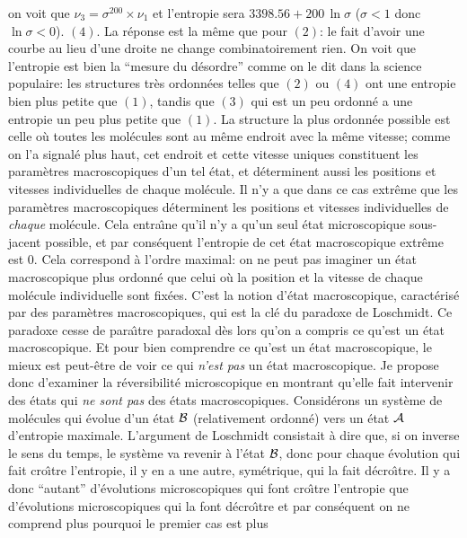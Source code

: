on voit que $\nu_3 = \sigma^{200} \times \nu_1$ et l'entropie 
sera $3398.56 + 200\,\ln\sigma$ ($\sigma < 1$ donc $\ln\sigma < 0$).
\medskip
$(4)$. La r\'eponse est la m\^eme que pour $(2)$: le fait d'avoir une 
courbe au lieu d'une droite ne change combinatoirement rien.
\medskip
On voit que l'entropie est bien la ``mesure du d\'esordre'' comme on le 
dit dans la science populaire: les structures tr\`es ordonn\'ees telles 
que $(2)$ ou $(4)$ ont une entropie bien plus petite que $(1)$, tandis que 
$(3)$ qui est un peu ordonn\'e a une entropie un peu plus petite que 
$(1)$. La structure la plus ordonn\'ee possible est celle o\`u toutes les 
mol\'ecules sont au m\^eme endroit avec la m\^eme vitesse; comme on l'a 
signal\'e plus haut, cet endroit et cette vitesse uniques constituent les 
param\`etres macroscopiques d'un tel \'etat, et d\'eterminent aussi les 
positions et vitesses individuelles de chaque mol\'ecule. Il n'y a que 
dans ce cas extr\^eme que les param\`etres macroscopiques d\'eterminent 
les positions et vitesses individuelles de {\it chaque} mol\'ecule. Cela
entra{\^\i}ne qu'il n'y a qu'un seul \'etat microscopique sous-jacent 
possible, et par cons\'equent l'entropie de cet \'etat macroscopique 
extr\^eme est $0$. Cela correspond \`a l'ordre maximal: on ne peut pas 
imaginer un \'etat macroscopique plus ordonn\'e que celui o\`u la position 
et la vitesse de chaque mol\'ecule individuelle sont fix\'ees. 
\medskip 
C'est la notion d'\'etat macroscopique, caract\'eris\'e par des param\`etres 
macroscopiques, qui est la cl\'e du paradoxe de Loschmidt. Ce paradoxe 
cesse de para{\^\i}tre paradoxal d\`es lors qu'on a compris ce qu'est 
un \'etat macroscopique. Et pour bien comprendre ce qu'est un \'etat 
macroscopique, le mieux est peut-\^etre de voir ce qui {\it n'est pas}
un \'etat macroscopique. Je propose donc d'examiner la r\'eversibilit\'e 
microscopique en montrant qu'elle fait intervenir des \'etats qui {\it ne 
sont pas} des \'etats macroscopiques. 
\medskip
Consid\'erons un syst\`eme de mol\'ecules qui \'evolue d'un \'etat 
${\cal B}$ (relativement ordonn\'e) vers un \'etat ${\cal A}$ d'entropie 
maximale. L'argument de Loschmidt consistait \`a dire que, si on inverse 
le sens du temps, le sys\-t\`eme va revenir \`a l'\'etat ${\cal B}$, donc 
pour chaque \'evolution qui fait cro{\^\i}tre l'entropie, il y en a une 
autre, sym\'etrique, qui la fait d\'ecro{\^\i}tre. Il y a donc ``autant'' 
d'\'evolutions microscopiques qui font cro{\^\i}tre l'entropie que 
d'\'evolutions microscopiques qui la font d\'ecro{\^\i}tre et par 
cons\'equent on ne comprend plus pourquoi le premier cas est plus 
